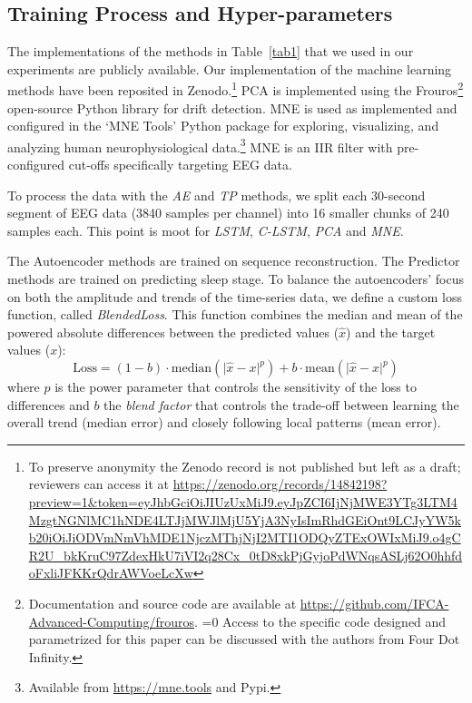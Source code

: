 \documentclass[conference]{IEEEtran}
\def\anon{0}
\begin{document}
\subsection{Training Process and Hyper-parameters}

The implementations of the methods in Table~\ref{tab1} that we used in
our experiments are publicly available. Our implementation of the
machine learning methods have been reposited in Zenodo.\footnote{To preserve
  anonymity the Zenodo record is not published but left as a draft;
  reviewers can access it at
  \url{https://zenodo.org/records/14842198?preview=1&token=eyJhbGciOiJIUzUxMiJ9.eyJpZCI6IjNjMWE3YTg3LTM4MzgtNGNlMC1hNDE4LTJjMWJlMjU5YjA3NyIsImRhdGEiOnt9LCJyYW5kb20iOiJiODVmNmVhMDE1NjczMThjNjI2MTI1ODQyZTExOWIxMiJ9.o4gCR2U_bkKruC97ZdexHkU7iVI2q28Cx_0tD8xkPjGyjoPdWNqsASLj62O0hhfdoFxliJFKKrQdrAWVoeLcXw}}
PCA is implemented using the
Frouros\footnote{Documentation and source code are available at
  \url{https://github.com/IFCA-Advanced-Computing/frouros}.
\ifnum\anon=0
  Access to the specific code designed and parametrized for this
  paper can be discussed with the authors from Four Dot Infinity.
\fi
}
open-source Python library for drift detection.
MNE is used as implemented and configured in the `MNE Tools' Python
package for exploring, visualizing, and analyzing human
neurophysiological data.\footnote{Available from \url{https://mne.tools} and Pypi.}
MNE is an IIR filter with pre-configured cut-offs specifically
targeting EEG data.

To process the data with the \emph{AE} and \emph{TP} methods, we split
each 30-second segment of EEG data (3840 samples per channel) into 16
smaller chunks of 240 samples each. This point is moot for \emph{LSTM},
\emph{C-LSTM}, \emph{PCA} and \emph{MNE}.

The Autoencoder methods are trained on sequence reconstruction. The
Predictor methods are trained on predicting sleep stage.
%
To balance the autoencoders' focus on both the amplitude and trends of the
time-series data, we define a custom loss function, called
\emph{BlendedLoss}. This function combines the median and mean of the
powered absolute differences between the predicted values ($\hat{x}$)
and the target values ($x$):
%
$$
\text{Loss} =
  (1 - b)\cdot\mathrm{median}(\lvert \hat{x} - x \rvert^p) +
  b\cdot\mathrm{mean}(\lvert \hat{x} - x \rvert^p)
$$
%
where $p$ is the power parameter that controls the sensitivity of the
loss to differences and $b$ the \emph{blend factor} that controls
the trade-off between learning the overall trend (median error) and
closely following local patterns (mean error).
\end{document}
